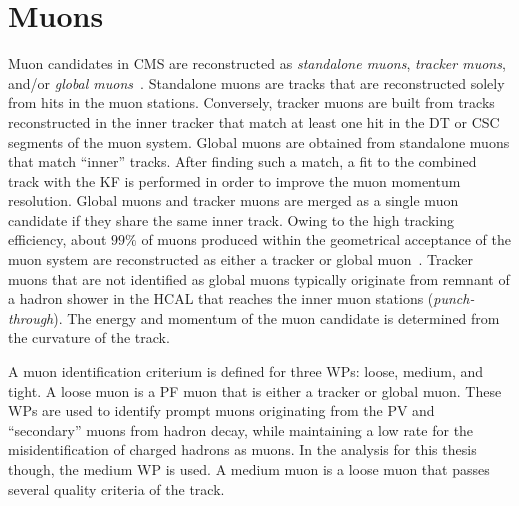 \section{Muons} \label{sec:muon}
Muon candidates in CMS are reconstructed as \emph{standalone muons}, \emph{tracker muons}, and/or \emph{global muons}~\cite{CMS_muon_2018}.
Standalone muons are tracks that are reconstructed solely from hits in the muon stations.
Conversely, tracker muons are built from tracks reconstructed in the inner tracker that match at least one hit in the DT or CSC segments of the muon system.
Global muons are obtained from standalone muons that match ``inner'' tracks. After finding such a match, a fit to the combined track with the KF is performed in order to improve the muon momentum resolution.
Global muons and tracker muons are merged as a single muon candidate if they share the same inner track.
Owing to the high tracking efficiency, about $99\%$ of muons produced within the geometrical acceptance of the muon system are reconstructed as either a tracker or global muon~\cite{CMS_muon_2018}.
Tracker muons that are not identified as global muons typically originate from remnant of a hadron shower in the HCAL that reaches the inner muon stations (\emph{punch-through}).
The energy and momentum of the muon candidate is determined from the curvature of the track.

A muon identification criterium is defined for three WPs: loose, medium, and tight.
A loose muon is a PF muon that is either a tracker or global muon. These WPs are used to identify prompt muons originating from the PV and ``secondary'' muons from hadron decay, while maintaining a low rate for the misidentification of charged hadrons as muons.
In the analysis for this thesis though, the medium WP is used. A medium muon is a loose muon that passes several quality criteria of the track. %


